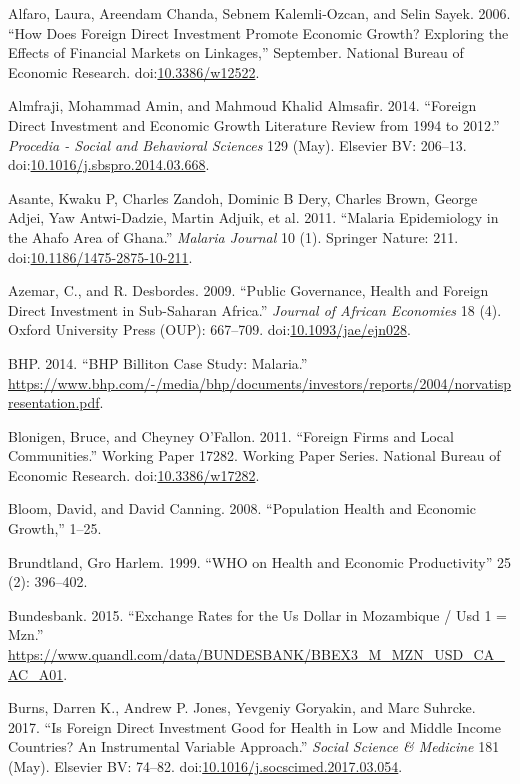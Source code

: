 \documentclass[]{article}
\begin{document}
\hypertarget{ref-Alfaro_2006}{}
Alfaro, Laura, Areendam Chanda, Sebnem Kalemli-Ozcan, and Selin Sayek.
2006. ``How Does Foreign Direct Investment Promote Economic Growth?
Exploring the Effects of Financial Markets on Linkages,'' September.
National Bureau of Economic Research.
doi:\href{https://doi.org/10.3386/w12522}{10.3386/w12522}.

\hypertarget{ref-Almfraji_2014}{}
Almfraji, Mohammad Amin, and Mahmoud Khalid Almsafir. 2014. ``Foreign
Direct Investment and Economic Growth Literature Review from 1994 to
2012.'' \emph{Procedia - Social and Behavioral Sciences} 129 (May).
Elsevier BV: 206--13.
doi:\href{https://doi.org/10.1016/j.sbspro.2014.03.668}{10.1016/j.sbspro.2014.03.668}.

\hypertarget{ref-Asante_2011}{}
Asante, Kwaku P, Charles Zandoh, Dominic B Dery, Charles Brown, George
Adjei, Yaw Antwi-Dadzie, Martin Adjuik, et al. 2011. ``Malaria
Epidemiology in the Ahafo Area of Ghana.'' \emph{Malaria Journal} 10
(1). Springer Nature: 211.
doi:\href{https://doi.org/10.1186/1475-2875-10-211}{10.1186/1475-2875-10-211}.

\hypertarget{ref-Azemar2009}{}
Azemar, C., and R. Desbordes. 2009. ``Public Governance, Health and
Foreign Direct Investment in Sub-Saharan Africa.'' \emph{Journal of
African Economies} 18 (4). Oxford University Press (OUP): 667--709.
doi:\href{https://doi.org/10.1093/jae/ejn028}{10.1093/jae/ejn028}.

\hypertarget{ref-bhp}{}
BHP. 2014. ``BHP Billiton Case Study: Malaria.''
\url{https://www.bhp.com/-/media/bhp/documents/investors/reports/2004/norvatispresentation.pdf}.

\hypertarget{ref-NBERw17282}{}
Blonigen, Bruce, and Cheyney O'Fallon. 2011. ``Foreign Firms and Local
Communities.'' Working Paper 17282. Working Paper Series. National
Bureau of Economic Research.
doi:\href{https://doi.org/10.3386/w17282}{10.3386/w17282}.

\hypertarget{ref-Bloom2008}{}
Bloom, David, and David Canning. 2008. ``Population Health and Economic
Growth,'' 1--25.

\hypertarget{ref-World1999}{}
Brundtland, Gro Harlem. 1999. ``WHO on Health and Economic
Productivity'' 25 (2): 396--402.

\hypertarget{ref-deutsche}{}
Bundesbank. 2015. ``Exchange Rates for the Us Dollar in Mozambique / Usd
1 = Mzn.''
\url{https://www.quandl.com/data/BUNDESBANK/BBEX3_M_MZN_USD_CA_AC_A01}.

\hypertarget{ref-Burns_2017}{}
Burns, Darren K., Andrew P. Jones, Yevgeniy Goryakin, and Marc Suhrcke.
2017. ``Is Foreign Direct Investment Good for Health in Low and Middle
Income Countries? An Instrumental Variable Approach.'' \emph{Social
Science \& Medicine} 181 (May). Elsevier BV: 74--82.
doi:\href{https://doi.org/10.1016/j.socscimed.2017.03.054}{10.1016/j.socscimed.2017.03.054}.
\end{document}
